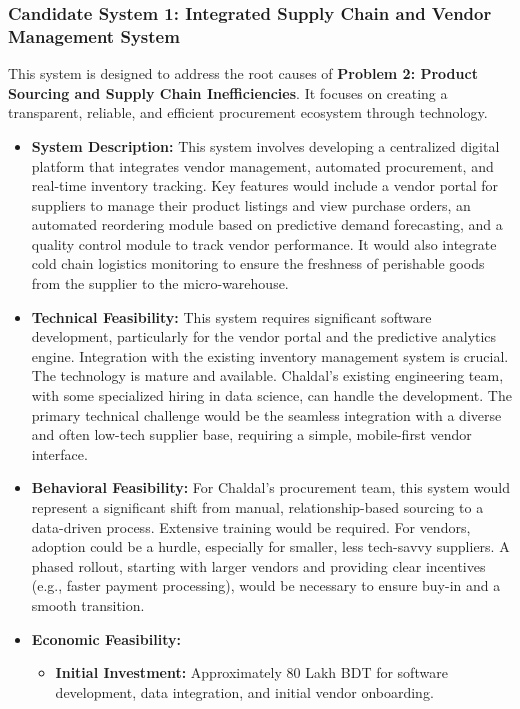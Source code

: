 \documentclass[12pt,a4paper]{article}
\begin{document}
\subsubsection{Candidate System 1: Integrated Supply Chain and Vendor Management System}
This system is designed to address the root causes of \textbf{Problem 2: Product Sourcing and Supply Chain Inefficiencies}. It focuses on creating a transparent, reliable, and efficient procurement ecosystem through technology.
\begin{itemize}
    \item \textbf{System Description:} This system involves developing a centralized digital platform that integrates vendor management, automated procurement, and real-time inventory tracking. Key features would include a vendor portal for suppliers to manage their product listings and view purchase orders, an automated reordering module based on predictive demand forecasting, and a quality control module to track vendor performance. It would also integrate cold chain logistics monitoring to ensure the freshness of perishable goods from the supplier to the micro-warehouse.
    \item \textbf{Technical Feasibility:} This system requires significant software development, particularly for the vendor portal and the predictive analytics engine. Integration with the existing inventory management system is crucial. The technology is mature and available. Chaldal's existing engineering team, with some specialized hiring in data science, can handle the development. The primary technical challenge would be the seamless integration with a diverse and often low-tech supplier base, requiring a simple, mobile-first vendor interface.
    \item \textbf{Behavioral Feasibility:} For Chaldal's procurement team, this system would represent a significant shift from manual, relationship-based sourcing to a data-driven process. Extensive training would be required. For vendors, adoption could be a hurdle, especially for smaller, less tech-savvy suppliers. A phased rollout, starting with larger vendors and providing clear incentives (e.g., faster payment processing), would be necessary to ensure buy-in and a smooth transition.
    \item \textbf{Economic Feasibility:} 
    \begin{itemize}
        \item \textbf{Initial Investment:} Approximately 80 Lakh BDT for software development, data integration, and initial vendor onboarding.

\end{itemize}
\end{itemize}
\end{document}
